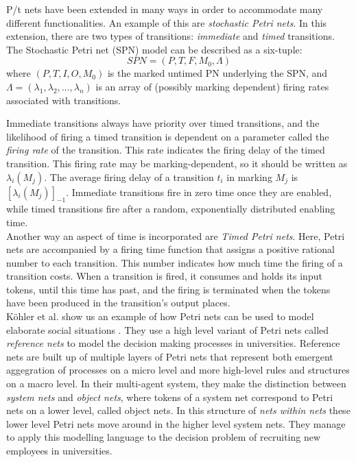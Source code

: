 \documentclass[11pt, a4paper]{book}
\begin{document}
P/t nets have been extended in many ways in order to accommodate many different functionalities. An example of this are \emph{stochastic Petri nets}. In this extension, there are two types of transitions: \emph{immediate} and \emph{timed} transitions.
The Stochastic Petri net (SPN) model can be described as a six-tuple:
\begin{equation}
SPN = (P,T,F,M_0,\Lambda)
\end{equation}
where $(P,T,I,O,M_0)$ is the marked untimed PN underlying the SPN, and $\Lambda = (\lambda_1, \lambda_2, \ldots, \lambda_n)$ is an array of (possibly marking dependent) firing rates associated with transitions.

Immediate transitions always have priority over timed transitions, and  the likelihood of firing a timed transition is dependent on a parameter called the \emph{firing rate} of the transition. This rate indicates the firing delay of the timed transition. This firing rate may be marking-dependent, so it should be written as $\lambda_i(M_j)$.  The average firing delay of a transition $t_i$ in marking $M_j$ is $[\lambda_i(M_j)]_{-1}$. Immediate transitions fire in zero time once they are enabled, while timed transitions fire after a random, exponentially distributed enabling time.\\
Another way an aspect of time is incorporated are \emph{Timed Petri nets}\cite{zuberek1980timed}. Here, Petri nets are accompanied by a firing time function that assigns a positive rational number to each transition. This number indicates how much time the firing of a transition costs. When a transition is fired, it consumes and holds its input tokens, until this time has past, and the firing is terminated when the tokens have been produced in the transition's output places.\\
K\"{o}hler et al. show us an example of how Petri nets can be used to model elaborate social situations \cite{Köhler03modellingsocial}. They use a high level variant of Petri nets called \emph{reference nets} to model the decision making processes in universities. Reference nets are built up of multiple layers of Petri nets that represent both emergent aggegration of processes on a micro level and more high-level rules and structures on a macro level. In their multi-agent system, they make the distinction between \emph{system nets} and \emph{object nets}, where tokens of a system net correspond to Petri nets on a lower level, called object nets. In this structure of \emph{nets within nets} these lower level Petri nets move around in the higher level system nets. They manage to apply this modelling language to the decision problem of recruiting new employees in universities.
\end{document}
